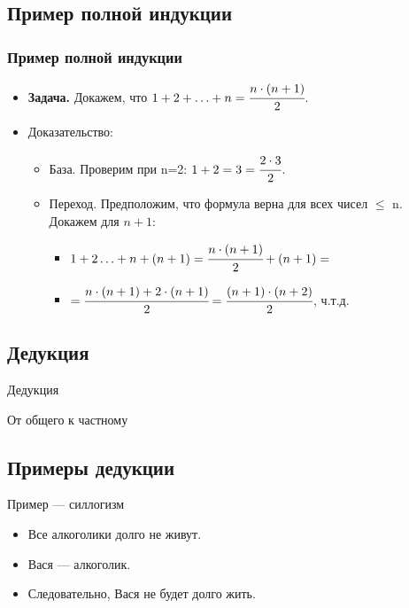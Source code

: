 \documentclass[compress,red]{beamer}
\begin{document}
\subsection{Пример полной индукции}
\begin{frame}[fragile]
  \frametitle{Пример полной индукции}
  \begin{itemize}
    \item \textbf{Задача.} Докажем, что $1+2+\ldots+n = \cfrac{n\cdot(n+1)}{2}$.
    \item Доказательство:
      \begin{itemize}
        \item База. Проверим при n=2: $1+2 = 3 = \cfrac{2\cdot 3}{2}$.
        \item Переход. Предположим, что формула верна для всех чисел $\leq$ n. Докажем для $n+1$:
          \begin{itemize}
            \item $1+2\ldots +n + (n+1) = \cfrac{n\cdot (n+1)}{2} + (n+1) =$
            \item $ = \cfrac{n\cdot (n+1) + 2\cdot(n+1)}{2} = \cfrac{(n+1)\cdot (n+2)}{2}$, ч.т.д. 
          \end{itemize}
      \end{itemize}
    
  \end{itemize}
\end{frame}

\subsection{Дедукция}
\begin{frame}
  \begin{center}
    \Huge{Дедукция}
  \end{center}
  \begin{center}
    \Large{От общего к частному}
  \end{center}
\end{frame}

\subsection{Примеры дедукции}
\begin{frame}
  \begin{center}
    \Huge{Пример --- силлогизм}
  \end{center}
  \begin{center}
    \Large{
      \begin{itemize}
        \item Все алкоголики долго не живут.
        \item Вася --- алкоголик.
        \item Следовательно, Вася не будет долго жить.
      \end{itemize}
    }
  \end{center}
\end{frame}
\end{document}
